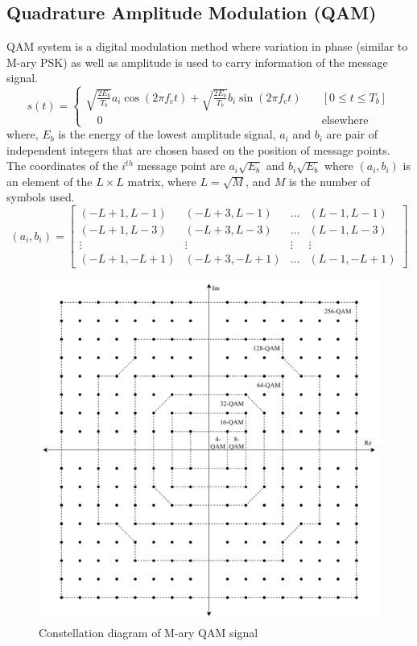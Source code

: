 \documentclass{lab_sheet}
\newcommand\ddfrac[2]{\frac{\displaystyle #1}{\displaystyle #2}}
\begin{document}
\subsection{Quadrature Amplitude Modulation (QAM)}
QAM system is a digital modulation method where variation in phase (similar to M-ary PSK) as well as amplitude is used to carry information of the message signal.
\begin{equation}
    s(t)=\begin{cases}
        \sqrt{\ddfrac{2E_b}{T_b}}a_i \cos(2\pi f_c t)+\sqrt{\ddfrac{2E_b}{T_b}}b_i \sin(2\pi f_c t)\quad &[0\leq t \leq T_b]\\
        \quad 0 &\text{elsewhere}
    \end{cases}
    \label{eqn:qam_general}
\end{equation}
where, $E_b$ is the energy of the lowest amplitude signal, $a_i$ and $b_i$ are pair of independent integers that are chosen based on the position of message points. The coordinates of the $i^{th}$ message point are $a_i\sqrt{E_b}$ and $b_i\sqrt{E_b}$ where $(a_i,b_i)$ is an element of the $L\times L$ matrix, where $L=\sqrt{M}$, and $M$ is the number of symbols used.
\begin{equation}
   (a_i,b_i)= \begin{bmatrix} 
        (-L+1,L-1) & (-L+3, L-1) & \dots & (L-1,L-1) \\
        (-L+1,L-3) & (-L+3, L-3) & \dots & (L-1,L-3) \\
        \vdots & \vdots & \vdots & \vdots \\
        (-L+1,-L+1) & (-L+3, -L+1) & \dots & (L-1,-L+1)
      \end{bmatrix} 
\end{equation}
\begin{figure}[H]
    \centering
    \includegraphics[width=\linewidth]{../Figures/qam_const}
    \caption{Constellation diagram of M-ary QAM signal}
    \label{fig:qam_const}
\end{figure}
\end{document}
